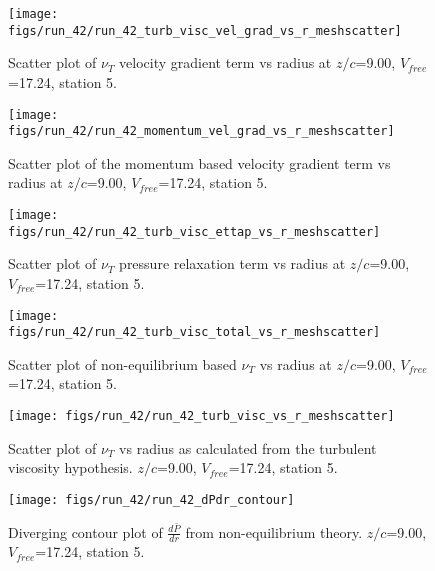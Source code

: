 \begin{figure}[H]
\centering
\texttt{[image: figs/run\_42/run\_42\_turb\_visc\_vel\_grad\_vs\_r\_meshscatter]}
\caption{Scatter plot of $\nu_T$ velocity gradient term vs radius at $z/c$=9.00, $V_{free}$=17.24, station 5.}
\end{figure}


\begin{figure}[H]
\centering
\texttt{[image: figs/run\_42/run\_42\_momentum\_vel\_grad\_vs\_r\_meshscatter]}
\caption{Scatter plot of the momentum based velocity gradient term vs radius at $z/c$=9.00, $V_{free}$=17.24, station 5.}
\end{figure}


\begin{figure}[H]
\centering
\texttt{[image: figs/run\_42/run\_42\_turb\_visc\_ettap\_vs\_r\_meshscatter]}
\caption{Scatter plot of $\nu_T$ pressure relaxation term vs radius at $z/c$=9.00, $V_{free}$=17.24, station 5.}
\end{figure}


\begin{figure}[H]
\centering
\texttt{[image: figs/run\_42/run\_42\_turb\_visc\_total\_vs\_r\_meshscatter]}
\caption{Scatter plot of non-equilibrium based $\nu_T$ vs radius at $z/c$=9.00, $V_{free}$=17.24, station 5.}
\end{figure}


\begin{figure}[H]
\centering
\texttt{[image: figs/run\_42/run\_42\_turb\_visc\_vs\_r\_meshscatter]}
\caption{Scatter plot of $\nu_T$ vs radius as calculated from the turbulent viscosity hypothesis. $z/c$=9.00, $V_{free}$=17.24, station 5.}
\end{figure}


\begin{figure}[H]
\centering
\texttt{[image: figs/run\_42/run\_42\_dPdr\_contour]}
\caption{Diverging contour plot of $\frac{d\bar{P}}{dr}$ from non-equilibrium theory. $z/c$=9.00, $V_{free}$=17.24, station 5.}
\end{figure}



